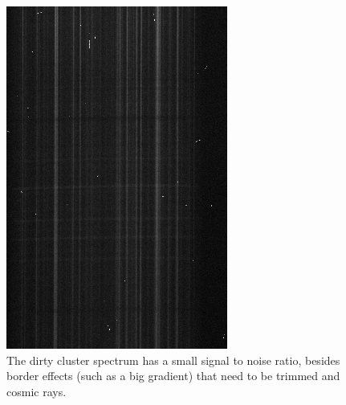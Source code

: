 \begin{figure}[H]
  \centering
  \begin{minipage}[b]{0.45\textwidth}
    \includegraphics[width=\textwidth]{images/cluster_dirty.png}
    \caption[Dirty spectrum of NGC5139]{The dirty cluster spectrum has a small signal to noise ratio, besides border effects (such as a big gradient) that need to be trimmed and cosmic rays.}
  \end{minipage}
  \hfill
  \begin{minipage}[b]{0.45\textwidth}

\end{minipage}
\end{figure}

